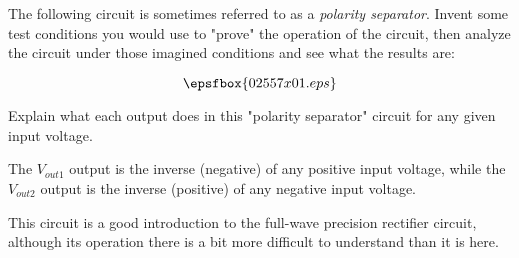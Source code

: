 

The following circuit is sometimes referred to as a {\it polarity separator}.  Invent some test conditions you would use to "prove" the operation of the circuit, then analyze the circuit under those imagined conditions and see what the results are:

$$\epsfbox{02557x01.eps}$$

Explain what each output does in this "polarity separator" circuit for any given input voltage.







The $V_{out1}$ output is the inverse (negative) of any positive input voltage, while the $V_{out2}$ output is the inverse (positive) of any negative input voltage.







This circuit is a good introduction to the full-wave precision rectifier circuit, although its operation there is a bit more difficult to understand than it is here.





